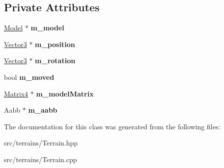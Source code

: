 \subsection*{Private Attributes}
\begin{DoxyCompactItemize}
\item 
\mbox{\label{class_flounder_1_1_terrain_a7e7a88a1f1a697c487fca40a1bd1ad0b}} 
\hyperlink{class_flounder_1_1_model}{Model} $\ast$ {\bfseries m\+\_\+model}
\item 
\mbox{\label{class_flounder_1_1_terrain_a94ba19382ba520c165b9e11f782094df}} 
\hyperlink{class_flounder_1_1_vector3}{Vector3} $\ast$ {\bfseries m\+\_\+position}
\item 
\mbox{\label{class_flounder_1_1_terrain_a33122f8ea8f7a25fd64701a228404be5}} 
\hyperlink{class_flounder_1_1_vector3}{Vector3} $\ast$ {\bfseries m\+\_\+rotation}
\item 
\mbox{\label{class_flounder_1_1_terrain_a02efb14fbf52ca298803fa8d7a46f497}} 
bool {\bfseries m\+\_\+moved}
\item 
\mbox{\label{class_flounder_1_1_terrain_a79c11c4c51eb7f7e72c4ae68bc022346}} 
\hyperlink{class_flounder_1_1_matrix4}{Matrix4} $\ast$ {\bfseries m\+\_\+model\+Matrix}
\item 
\mbox{\label{class_flounder_1_1_terrain_ab2a3427b5aa72b905c37d700494f29c0}} 
Aabb $\ast$ {\bfseries m\+\_\+aabb}
\end{DoxyCompactItemize}


The documentation for this class was generated from the following files\+:\begin{DoxyCompactItemize}
\item 
src/terrains/Terrain.\+hpp\item 
src/terrains/Terrain.\+cpp\end{DoxyCompactItemize}
